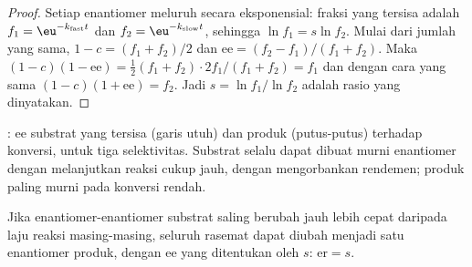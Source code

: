 \begin{proof}
Setiap enantiomer meluruh secara eksponensial: fraksi yang tersisa adalah $f_1 = \eu^{-k_{\mathrm{fast}}t}$ dan
$f_2 = \eu^{-k_{\mathrm{slow}}t}$, sehingga $\ln f_1 = s\ln f_2$. Mulai dari jumlah yang sama, $1 - c = (f_1 + f_2)/2$ dan
$\mathrm{ee} = (f_2 - f_1)/(f_1 + f_2)$. Maka $(1 - c)(1 - \mathrm{ee}) = \tfrac12(f_1 + f_2)\cdot 2f_1/(f_1 + f_2) = f_1$ dan dengan cara yang sama
$(1 - c)(1 + \mathrm{ee}) = f_2$. Jadi $s = \ln f_1/\ln f_2$ adalah rasio yang dinyatakan.
\end{proof}

\begin{omfigure}

{\small {}: ee substrat yang tersisa (garis utuh) dan
produk (putus-putus) terhadap konversi, untuk tiga selektivitas. Substrat
selalu dapat dibuat murni enantiomer dengan melanjutkan reaksi cukup jauh, dengan mengorbankan rendemen;
produk paling murni pada konversi rendah.}
\end{omfigure}

\begin{proposition}\label{prop:b3:asymmetric-synthesis:dkr}
Jika enantiomer-enantiomer substrat saling berubah jauh lebih cepat daripada laju reaksi masing-masing,
seluruh rasemat dapat diubah menjadi satu enantiomer produk, dengan ee yang ditentukan oleh $s$:
$\mathrm{er} = s$.
\end{proposition}

